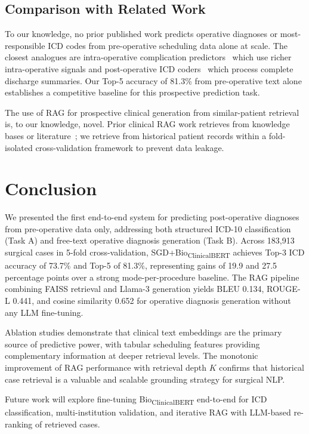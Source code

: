 \documentclass[10pt,twocolumn]{article}
\begin{document}
\subsection{Comparison with Related Work}
To our knowledge, no prior published work predicts operative diagnoses or most-responsible ICD codes from pre-operative scheduling data alone at scale. The closest analogues are intra-operative complication predictors~\cite{bihorac2019} which use richer intra-operative signals and post-operative ICD coders~\cite{mullenbach2018explainable} which process complete discharge summaries. Our Top-5 accuracy of 81.3\% from pre-operative text alone establishes a competitive baseline for this prospective prediction task.

The use of RAG for prospective clinical generation from similar-patient retrieval is, to our knowledge, novel. Prior clinical RAG work retrieves from knowledge bases or literature~\cite{wang2023retrieval}; we retrieve from historical patient records within a fold-isolated cross-validation framework to prevent data leakage.

\section{Conclusion}
\label{sec:conclusion}

We presented the first end-to-end system for predicting post-operative diagnoses from pre-operative data only, addressing both structured ICD-10 classification (Task A) and free-text operative diagnosis generation (Task B). Across 183,913 surgical cases in 5-fold cross-validation, SGD+Bio\textsubscript{ClinicalBERT} achieves Top-3 ICD accuracy of 73.7\% and Top-5 of 81.3\%, representing gains of 19.9 and 27.5 percentage points over a strong mode-per-procedure baseline. The RAG pipeline combining FAISS retrieval and Llama-3 generation yields BLEU 0.134, ROUGE-L 0.441, and cosine similarity 0.652 for operative diagnosis generation without any LLM fine-tuning.

Ablation studies demonstrate that clinical text embeddings are the primary source of predictive power, with tabular scheduling features providing complementary information at deeper retrieval levels. The monotonic improvement of RAG performance with retrieval depth $K$ confirms that historical case retrieval is a valuable and scalable grounding strategy for surgical NLP.

Future work will explore fine-tuning Bio\textsubscript{ClinicalBERT} end-to-end for ICD classification, multi-institution validation, and iterative RAG with LLM-based re-ranking of retrieved cases.
\end{document}
